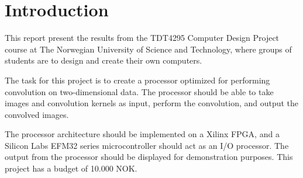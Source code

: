 \chapter{Introduction}
\label{subsec:assignment-text}
This report present the results from the TDT4295 Computer Design Project course at The Norwegian University of Science and Technology, where groups of students are to design and create their own computers.

The task for this project is to create a processor optimized for performing convolution on two-dimensional data. The processor should be able to take images and convolution kernels as input, perform the convolution, and output the convolved images.

The processor architecture should be implemented on a Xilinx FPGA, and a Silicon Labs EFM32 series microcontroller should act as an I/O processor. The output from the processor should be displayed for demonstration purposes. This project has a budget of 10.000 NOK.



